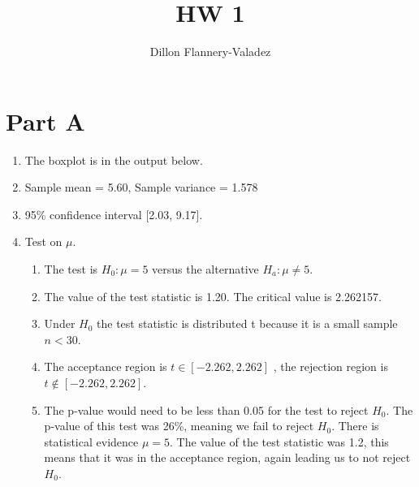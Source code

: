 \documentclass{article}
\begin{document}
\author{Dillon Flannery-Valadez}
\title{HW 1}

\maketitle

\section*{Part A}
\begin{enumerate}
  \item The boxplot is in the output below.
  \item Sample mean = 5.60, Sample variance = 1.578
  \item 95\% confidence interval [2.03, 9.17]. 
  \item Test on $\mu$. 
  \begin{enumerate}
    \item The test is $ H_0: \mu = 5 $ versus the alternative $ H_a: \mu \neq 5 $. 
    \item The value of the test statistic is 1.20. The critical value is 2.262157. 
    \item Under $H_0$ the test statistic is distributed t because it is a small sample $ n < 30 $. 
    \item The acceptance region is $ t \in [-2.262, 2.262]$ , the rejection region is $ t\notin [-2.262, 2.262] $. 
    \item The p-value would need to be less than 0.05 for the test to reject $H_0$. The p-value of this test was 26\%, meaning we fail to reject $H_0$. There is statistical evidence $\mu = 5$. The value of the test statistic was 1.2, this means that it was in the acceptance region, again leading us to not reject $H_0$. 
  \end{enumerate}
\end{enumerate}
\end{document}
